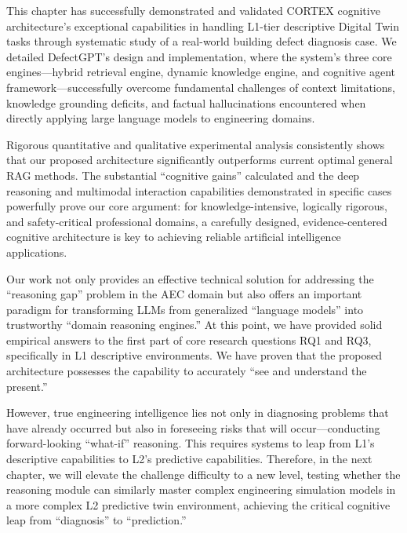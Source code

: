 This chapter has successfully demonstrated and validated CORTEX cognitive architecture's exceptional capabilities in handling L1-tier descriptive Digital Twin tasks through systematic study of a real-world building defect diagnosis case. We detailed DefectGPT's design and implementation, where the system's three core engines—hybrid retrieval engine, dynamic knowledge engine, and cognitive agent framework—successfully overcome fundamental challenges of context limitations, knowledge grounding deficits, and factual hallucinations encountered when directly applying large language models to engineering domains.

Rigorous quantitative and qualitative experimental analysis consistently shows that our proposed architecture significantly outperforms current optimal general RAG methods. The substantial ``cognitive gains'' calculated and the deep reasoning and multimodal interaction capabilities demonstrated in specific cases powerfully prove our core argument: for knowledge-intensive, logically rigorous, and safety-critical professional domains, a carefully designed, evidence-centered cognitive architecture is key to achieving reliable artificial intelligence applications.

Our work not only provides an effective technical solution for addressing the ``reasoning gap'' problem in the AEC domain but also offers an important paradigm for transforming LLMs from generalized ``language models'' into trustworthy ``domain reasoning engines.'' At this point, we have provided solid empirical answers to the first part of core research questions RQ1 and RQ3, specifically in L1 descriptive environments. We have proven that the proposed architecture possesses the capability to accurately ``see and understand the present.''

However, true engineering intelligence lies not only in diagnosing problems that have already occurred but also in foreseeing risks that will occur—conducting forward-looking ``what-if'' reasoning. This requires systems to leap from L1's descriptive capabilities to L2's predictive capabilities. Therefore, in the next chapter, we will elevate the challenge difficulty to a new level, testing whether the reasoning module can similarly master complex engineering simulation models in a more complex L2 predictive twin environment, achieving the critical cognitive leap from ``diagnosis'' to ``prediction.''
